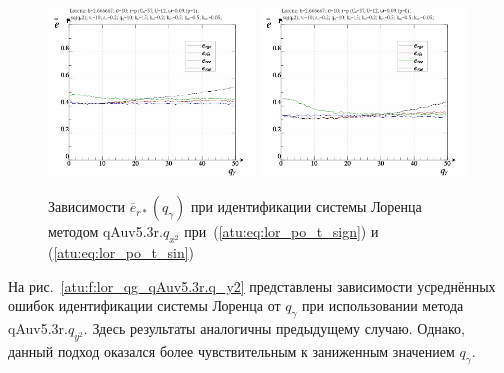 \begin{figure}[h!]
  \centerline{
    \includegraphics[width=0.49\textwidth]{p/cha/lor/qAuv5.3r/lor_qAuv5_3r_qx2-p_qgamma_e_sign.png}
    \hfill
    \includegraphics[width=0.49\textwidth]{p/cha/lor/qAuv5.3r/lor_qAuv5_3r_qx2-p_qgamma_e_sin.png}
  }
  \caption{Зависимости $\overline{e}_{r*}(q_\gamma)$ при идентификации системы Лоренца методом qAuv5.3r.$q_{x^2}$
   при~(\ref{atu:eq:lor_po_t_sign}) и (\ref{atu:eq:lor_po_t_sin})}
  \label{atu:f:lor_qg_qAuv5.3r.q_x2}
\end{figure}



На рис.~\ref{atu:f:lor_qg_qAuv5.3r.q_y2} представлены зависимости
усреднённых ошибок идентификации системы Лоренца от $q_\gamma$ при использовании метода qAuv5.3r.$q_{y^2}$.
Здесь результаты аналогичны предыдущему случаю. Однако,
данный подход оказался более чувствительным к заниженным значением $q_\gamma$.

